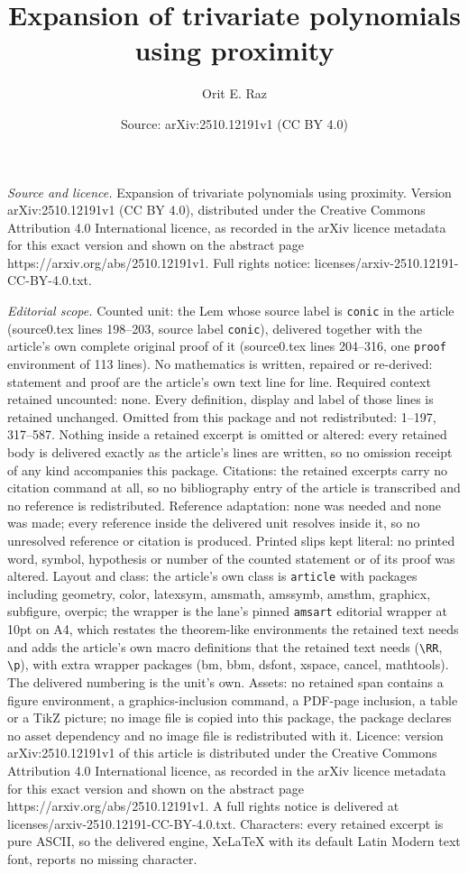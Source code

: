 \documentclass[10pt,a4paper]{amsart}
\title[Expansion of trivariate polynomials using proximity]{Expansion of trivariate polynomials using proximity}
\author{Orit E. Raz}
\date{Source: arXiv:2510.12191v1 (CC BY 4.0)}
\begin{document}
\maketitle

\noindent\emph{Source and licence.} Expansion of trivariate polynomials using proximity. Version arXiv:2510.12191v1 (CC BY 4.0), distributed under the Creative Commons Attribution 4.0 International licence, as recorded in the arXiv licence metadata for this exact version and shown on the abstract page https://arxiv.org/abs/2510.12191v1. Full rights notice: licenses/arxiv-2510.12191-CC-BY-4.0.txt.\par\smallskip

\noindent\textit{Editorial scope.} Counted unit: the Lem whose source label is \texttt{conic} in the article (source0.tex lines 198--203, source label \texttt{conic}), delivered together with the article's own complete original proof of it (source0.tex lines 204--316, one \texttt{proof} environment of 113 lines). No mathematics is written, repaired or re-derived: statement and proof are the article's own text line for line. Required context retained uncounted: none. Every definition, display and label of those lines is retained unchanged. Omitted from this package and not redistributed: 1--197, 317--587. Nothing inside a retained excerpt is omitted or altered: every retained body is delivered exactly as the article's lines are written, so no omission receipt of any kind accompanies this package. Citations: the retained excerpts carry no citation command at all, so no bibliography entry of the article is transcribed and no reference is redistributed. Reference adaptation: none was needed and none was made; every reference inside the delivered unit resolves inside it, so no unresolved reference or citation is produced. Printed slips kept literal: no printed word, symbol, hypothesis or number of the counted statement or of its proof was altered. Layout and class: the article's own class is \texttt{article} with packages including geometry, color, latexsym, amsmath, amssymb, amsthm, graphicx, subfigure, overpic; the wrapper is the lane's pinned \texttt{amsart} editorial wrapper at 10pt on A4, which restates the theorem-like environments the retained text needs and adds the article's own macro definitions that the retained text needs (\texttt{\textbackslash RR}, \texttt{\textbackslash p}), with extra wrapper packages (bm, bbm, dsfont, xspace, cancel, mathtools). The delivered numbering is the unit's own. Assets: no retained span contains a figure environment, a graphics-inclusion command, a PDF-page inclusion, a table or a TikZ picture; no image file is copied into this package, the package declares no asset dependency and no image file is redistributed with it. Licence: version arXiv:2510.12191v1 of this article is distributed under the Creative Commons Attribution 4.0 International licence, as recorded in the arXiv licence metadata for this exact version and shown on the abstract page https://arxiv.org/abs/2510.12191v1. A full rights notice is delivered at licenses/arxiv-2510.12191-CC-BY-4.0.txt. Characters: every retained excerpt is pure ASCII, so the delivered engine, XeLaTeX with its default Latin Modern text font, reports no missing character.
\end{document}
